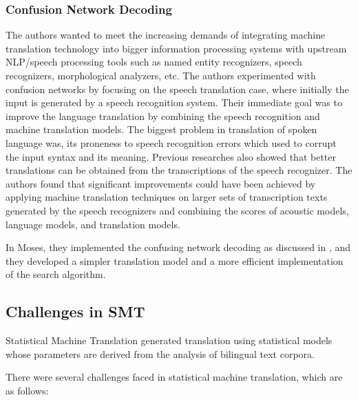 \subsubsection{Confusion Network Decoding}
The authors wanted to meet the increasing demands of integrating machine translation technology into bigger information processing systems with upstream NLP/speech processing tools such as named entity recognizers, speech recognizers, morphological analyzers, etc. The authors experimented with confusion networks by focusing on the speech translation case, where initially the input is generated by a speech recognition system. Their immediate goal was to improve the language translation by combining the speech recognition and machine translation models. The biggest problem in translation of spoken language was, its proneness to speech recognition errors which used to corrupt the input syntax and its meaning. Previous researches also showed that better translations can be obtained from the transcriptions of the speech recognizer.  The authors found that significant improvements could have been achieved by applying machine translation techniques on larger sets of transcription texts generated by the speech recognizers and combining the scores of acoustic models, language models, and translation models. 

In Moses, they implemented the confusing network decoding as discussed in \citep{4218346}, and they developed a simpler translation model and a more efficient implementation of the search algorithm.

\subsection{Challenges in SMT}

Statistical Machine Translation generated translation using statistical models whose parameters are derived from the analysis of bilingual text corpora. 

There were several challenges faced in statistical machine translation, which are as follows:


